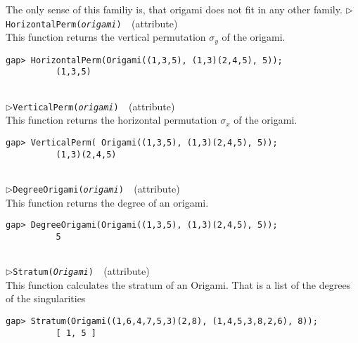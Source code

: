 \documentclass[a4paper,11pt]{report}
\begin{document}
{{{ The only sense of this familiy is, that origami does not fit in any other
family. \noindent\textcolor{FuncColor}{$\triangleright$\enspace\texttt{HorizontalPerm({\mdseries\slshape origami})
\label{HorizontalPerm}
}\hfill{\scriptsize (attribute)}}\\


 This function returns the vertical permutation $\sigma_y$ of the origami. 
\begin{Verbatim}[commandchars=!@|,fontsize=\small,frame=single,label=Example]
          gap> HorizontalPerm(Origami((1,3,5), (1,3)(2,4,5), 5));
          (1,3,5)
          
\end{Verbatim}
 \noindent\textcolor{FuncColor}{$\triangleright$\enspace\texttt{VerticalPerm({\mdseries\slshape origami})
\label{VerticalPerm}
}\hfill{\scriptsize (attribute)}}\\


 This function returns the horizontal permutation $\sigma_x$ of the origami. 
\begin{Verbatim}[commandchars=!@|,fontsize=\small,frame=single,label=Example]
          gap> VerticalPerm( Origami((1,3,5), (1,3)(2,4,5), 5));
          (1,3)(2,4,5)
          
\end{Verbatim}
 \noindent\textcolor{FuncColor}{$\triangleright$\enspace\texttt{DegreeOrigami({\mdseries\slshape origami})
\label{DegreeOrigami}
}\hfill{\scriptsize (attribute)}}\\


 This function returns the degree of an origami. 
\begin{Verbatim}[commandchars=!@|,fontsize=\small,frame=single,label=Example]
          gap> DegreeOrigami(Origami((1,3,5), (1,3)(2,4,5), 5));
          5
          
\end{Verbatim}
 \noindent\textcolor{FuncColor}{$\triangleright$\enspace\texttt{Stratum({\mdseries\slshape Origami})
\label{Stratum}
}\hfill{\scriptsize (attribute)}}\\


 This function calculates the stratum of an Origami. That is a list of the
degrees of the singularities 
\begin{Verbatim}[commandchars=!@|,fontsize=\small,frame=single,label=Example]
          gap> Stratum(Origami((1,6,4,7,5,3)(2,8), (1,4,5,3,8,2,6), 8));
          [ 1, 5 ]
          

\end{Verbatim}}}}
\end{document}
